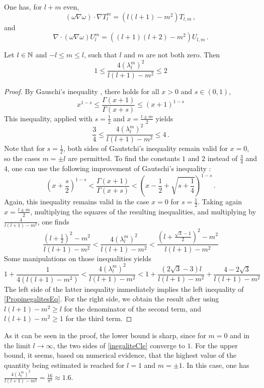 \documentclass[]{article}
\begin{document}
\begin{Cor}
	One has, for $l+m$ even,
	\[(\omega \nabla \omega) \cdot \nabla T_{l}^m = (l(l+1) - m^2)T_{l,m}\,,\]
	and
	\[\nabla \cdot (\omega \nabla \omega) U_{l}^m = ((l+1)(l+2) - m^2)U_{l,m}\,.\]
\end{Cor}

\begin{Prop}
	Let $l \in \mathbb{N}$ and $-l \leq m \leq l$, such that $l$ and $m$ are not both zero. Then
	\begin{equation}
		1 \leq \frac{4 \left(\lambda_{l}^m\right)^2}{l(l+1) - m^2} \leq 2
		\label{PropinegalitesEq}
	\end{equation}
\end{Prop}
\begin{proof}
 	By Gauschi's inequality \cite{gautschi1959some}, there holds for all $x > 0$ and $s \in (0,1)$, 
 	\[x^{1-s} \leq \frac{\Gamma(x + 1)}{\Gamma(x + s)} \leq (x+1)^{1-s}\]
 	This inequality, applied with $s = \frac{1}{2}$ and $x = \frac{l \pm m}{2}$ yields 
 	\[\frac{3}{4} \leq \frac{4 \left(\lambda_{l}^m\right)^2}{l(l+1) - m^2} \leq 4\,.\]
 	Note that for $s = \frac{1}{2}$, both sides of Gautstchi's inequality remain valid for $x = 0$, so the cases $m = \pm l$ are permitted. To find the constants $1$ and $2$ instead of $\frac{3}{4}$ and $4$, one can use the following improvement of Gautschi's inequality \cite{kershaw1983some}:
 	\[\left(x + \frac{s}{2}\right)^{1-s} < \frac{\Gamma(x + 1)}{\Gamma(x + s)} < \left(x - \frac{1}{2} + \sqrt{s + \frac{1}{4}}\right)^{1 - s}\,.\]
 	Again, this inequality remains valid in the case $x = 0$ for $s = \frac{1}{2}$. Taking again $x = \frac{ l \pm m }{2}$, multiplying the squares of the resulting inequalities, and multiplying by $\frac{4}{l(l+1) - m^2}$, one finds
 	\begin{equation}
 		\frac{(l+ \frac{1}{2})^2 - m^2}{l(l+1) - m^2} < \frac{4 \left(\lambda_{l}^m\right)^2}{l(l+1) - m^2} < \frac{(l+ \frac{\sqrt{3} - 1}{2})^2 - m^2}{l(l+1) - m^2}
 		\label{inegaliteCle}
 	\end{equation}
 	Some manipulations on those	 inequalities yields
 	\[1 + \frac{1}{4(l(l+1) - m^2)} <  \frac{4 \left(\lambda_{l}^m\right)^2}{l(l+1) - m^2} < 1 + \frac{(2\sqrt{3} - 3)l}{l(l+1) - m^2} + \frac{4 - 2\sqrt{3}}{l(l+1) - m^2}\]
 	The left side of the latter inequality immediately implies the left inequality of \eqref{PropinegalitesEq}. For the right side, we obtain the result after using $l(l+1) - m^2 \geq l$ for the denominator of the second term, and $l(l+1) - m^2 \geq 1$ for the third term.  
\end{proof}
As it can be seen in the proof, the lower bound is sharp, since for $m = 0$ and in the limit $l \to \infty$, the two sides of \eqref{inegaliteCle} converge to $1$. For the upper bound, it seems, based on numerical evidence, that the highest value of the quantity being estimated is reached for $l = 1$ and $m =\pm 1$. In this case, one has $\frac{4 \left(\lambda_{l}^m\right)^2}{l(l+1) - m^2} = \frac{16}{\pi^2} \approx 1.6$. 
\end{document}
